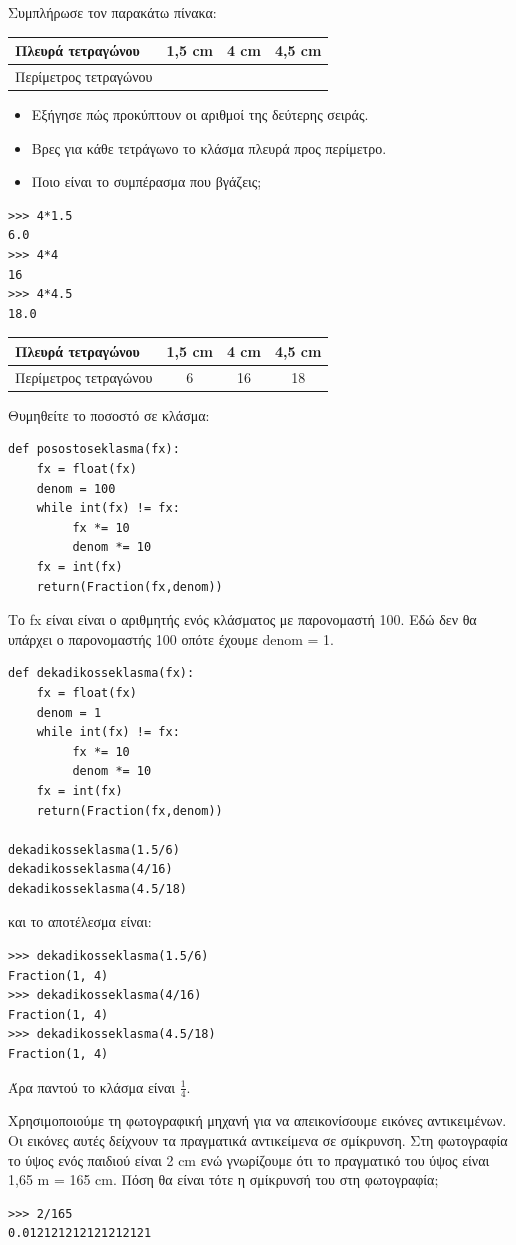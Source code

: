 \begin{exercise}
Συμπλήρωσε τον παρακάτω πίνακα:
\begin{table}
\begin{tabular}{|l|c|c|c|}
Πλευρά τετραγώνου& 1,5 cm& 4 cm& 4,5 cm\\\hline
Περίμετρος τετραγώνου&&&\\\hline
\end{tabular}
\end{table}
\begin{itemize}
\item Εξήγησε πώς προκύπτουν οι αριθμοί της δεύτερης σειράς.
\item Βρες για κάθε τετράγωνο το κλάσμα πλευρά προς περίμετρο.
\item Ποιο είναι το συμπέρασμα που βγάζεις;
\end{itemize}
\end{exercise}
\begin{lstlisting}
>>> 4*1.5
6.0
>>> 4*4
16
>>> 4*4.5
18.0
\end{lstlisting}
\begin{tabular}{|l|c|c|c|}
Πλευρά τετραγώνου& 1,5 cm& 4 cm& 4,5 cm\\\hline
Περίμετρος τετραγώνου&6&16&18\\\hline
\end{tabular}
Θυμηθείτε το ποσοστό σε κλάσμα:
\begin{lstlisting}
def posostoseklasma(fx):
    fx = float(fx)
    denom = 100
    while int(fx) != fx:
         fx *= 10
         denom *= 10
    fx = int(fx)
    return(Fraction(fx,denom))
\end{lstlisting}
Το fx είναι είναι ο αριθμητής ενός κλάσματος με παρονομαστή 100. Εδώ δεν θα υπάρχει ο παρονομαστής 100 οπότε έχουμε denom = 1.
\begin{lstlisting}
def dekadikosseklasma(fx):
    fx = float(fx)
    denom = 1
    while int(fx) != fx:
         fx *= 10
         denom *= 10
    fx = int(fx)
    return(Fraction(fx,denom))

dekadikosseklasma(1.5/6)
dekadikosseklasma(4/16)
dekadikosseklasma(4.5/18)
\end{lstlisting}
και το αποτέλεσμα είναι:
\begin{lstlisting}
>>> dekadikosseklasma(1.5/6)
Fraction(1, 4)
>>> dekadikosseklasma(4/16)
Fraction(1, 4)
>>> dekadikosseklasma(4.5/18)
Fraction(1, 4)
\end{lstlisting}
Άρα παντού το κλάσμα είναι $\frac{1}{4}$.
\begin{exercise}
Χρησιμοποιούμε τη φωτογραφική μηχανή
για να απεικονίσουμε εικόνες αντικειμένων. Οι εικόνες αυτές δείχνουν τα
πραγματικά αντικείμενα σε σμίκρυνση.
Στη φωτογραφία το ύψος ενός παιδιού
είναι 2 cm ενώ γνωρίζουμε ότι το πραγματικό του ύψος είναι 1,65 m = 165 cm. Πόση θα είναι τότε η σμίκρυνσή του
στη φωτογραφία;
\end{exercise}
\begin{lstlisting}
>>> 2/165
0.012121212121212121
\end{lstlisting}

